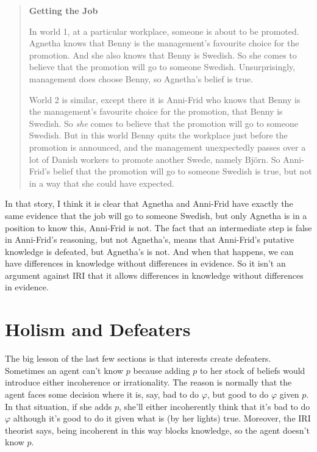 \begin{quote}
\textbf{Getting the Job}

In world 1, at a particular workplace, someone is about to be promoted. Agnetha knows that Benny is the management's favour\-ite choice for the promotion. And she also knows that Benny is Swedish. So she comes to believe that the promotion will go to someone Swedish. Unsurprisingly, management does choose Benny, so Agnetha's belief is true.

World 2 is similar, except there it is Anni-Frid who knows that Benny is the management's favourite choice for the promotion, that Benny is Swedish. So \textit{she} comes to believe that the promotion will go to someone Swedish. But in this world Benny quits the workplace just before the promotion is announced, and the management unexpectedly passes over a lot of Danish workers to promote another Swede, namely Bj\"orn. So Anni-Frid's belief that the  promotion will go to someone Swedish is true, but not in a way that she could have expected.
\end{quote}

\noindent In that story, I think it is clear that Agnetha and Anni-Frid have exactly the same evidence that the job will go to someone Swedish, but only Agnetha is in a position to know this, Anni-Frid is not. The fact that an intermediate step is false in Anni-Frid's reasoning, but not Agnetha's, means that Anni-Frid's putative knowledge is defeated, but Agnetha's is not. And when that happens, we can have differences in knowledge without differences in evidence. So it isn't an argument against IRI that it allows differences in knowledge without differences in evidence.

\section{Holism and Defeaters} \label{sect:holism}
The big lesson of the last few sections is that interests create defeaters. Sometimes an agent can't know $p$ because adding $p$ to her stock of beliefs would introduce either incoherence or irrationality. The reason is normally that the agent faces some decision where it is, say, bad to do $\varphi$, but good to do $\varphi$ given $p$. In that situation, if she adds $p$, she'll either incoherently think that it's bad to do $\varphi$ although it's good to do it given what is (by her lights) true. Moreover, the IRI theorist says, being incoherent in this way blocks knowledge, so the agent doesn't know $p$.

